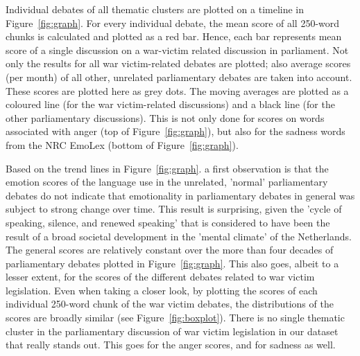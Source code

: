 \documentclass{dhbenelux}
\begin{document}
Individual debates of all thematic clusters are plotted on a timeline in
Figure~\ref{fig:graph}. 
For every individual debate, the mean score of all 250-word chunks is calculated and plotted as a red bar. Hence, each bar represents mean score of a single discussion on a war-victim related discussion in parliament. Not only the results for all war victim-related debates are plotted; also average scores (per month) of all other, unrelated parliamentary debates are taken into account. These scores are plotted here as grey dots. The moving averages are plotted as a coloured line (for the war victim-related discussions) and a black line (for the other parliamentary discussions). This is not only done for scores on words 
associated with anger (top of Figure~\ref{fig:graph}), but also for the sadness words from the NRC EmoLex (bottom of Figure~\ref{fig:graph}). 


Based on the trend lines in 
Figure~\ref{fig:graph}. 
a first observation is that the emotion scores of the language use in the unrelated, 'normal' parliamentary debates do not indicate that emotionality in parliamentary debates in general was subject to strong change over time. This result is surprising, given the 'cycle of speaking, silence, and renewed speaking' that is considered to have been the result of a broad societal development in the 'mental climate' of the Netherlands. The general scores are relatively constant over the more than four decades of parliamentary debates plotted in 
Figure~\ref{fig:graph}. 
This also goes, albeit to a lesser extent, for the scores of the different debates related to war victim legislation. Even when taking a closer look, by plotting the scores of each individual 250-word chunk of the war victim debates, the distributions of the scores are broadly similar (see 
Figure~\ref{fig:boxplot}). 
There is no single thematic cluster in the parliamentary discussion of war victim legislation in our dataset that really stands out. This goes for the anger scores, and for sadness as well.
\end{document}
